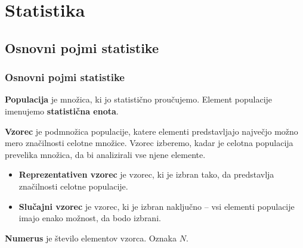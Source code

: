 \section{Statistika}

\begin{frame}
    \sectionpage
\end{frame}

\begin{frame}
\end{frame}


    \subsection{Osnovni pojmi statistike}

        \begin{frame}
            \frametitle{Osnovni pojmi statistike}

            \begin{alertblock}{}
                \textbf{Populacija} je množica, ki jo statistično proučujemo. 
                Element populacije imenujemo \textbf{statistična enota}. 
            \end{alertblock}
            
            \begin{alertblock}{}
                \textbf{Vzorec} je podmnožica populacije, katere elementi predstavljajo največjo možno mero značilnosti celotne množice. 
                Vzorec izberemo, kadar je celotna populacija prevelika množica, da bi analizirali vse njene elemente. \\
                
                \begin{itemize}
                    \item \textbf{Reprezentativen vzorec} je vzorec, ki je izbran tako, da predstavlja značilnosti celotne populacije.
                    \item \textbf{Slučajni vzorec} je vzorec, ki je izbran naključno -- vsi elementi populacije imajo enako možnost, da bodo izbrani.
                \end{itemize}

                \textbf{Numerus} je število elementov vzorca. Oznaka $N$. 
            \end{alertblock}

        \end{frame}    


